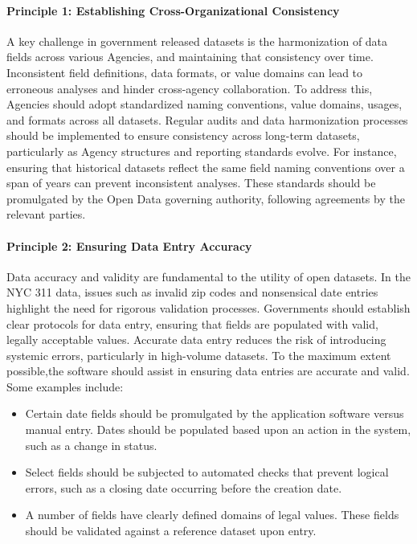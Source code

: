 \documentclass[linenumber]{jdsart}
\begin{document}
\paragraph{Principle 1: Establishing Cross-Organizational Consistency}
A key challenge in government released datasets is the 
harmonization of data fields across various Agencies, and 
maintaining that consistency over time. Inconsistent field
definitions, data formats, or value domains can lead to erroneous
analyses and hinder cross-agency collaboration.
To address this, Agencies should adopt 
standardized naming conventions, value domains, usages, and 
formats across all datasets. Regular audits and data harmonization 
processes should be implemented to ensure consistency 
across long-term datasets, particularly as Agency structures 
and reporting standards evolve. For instance, ensuring that 
historical datasets reflect the same field naming conventions 
over a span of years can prevent inconsistent analyses. 
These standards should be promulgated by the Open Data 
governing authority, following agreements by the relevant parties.

\paragraph{Principle 2: Ensuring Data Entry Accuracy}
Data accuracy and validity are fundamental to the utility of 
open datasets. In the NYC 311 data, issues such as 
invalid zip codes and nonsensical date entries 
highlight the need for rigorous validation processes. Governments 
should establish clear protocols for data entry, ensuring that 
fields are populated with valid, legally acceptable values. Accurate
data entry reduces the risk of introducing systemic errors,
particularly in high-volume datasets. To
the maximum extent possible,the software should assist in 
ensuring data entries are accurate and valid. Some examples include:

\begin{itemize}[left=1.5em]
    \item Certain date fields should be promulgated by the application software
     versus manual entry. Dates should be populated
    based upon an action in the system, such as a change in status. 
       
    \item Select fields should be subjected to automated checks 
    that prevent logical errors, such as a closing date occurring before the creation date. 
    
    \item A number of fields have clearly defined domains of legal
    values. These fields should be validated against a reference 
    dataset upon entry. 
 \end{itemize}
\end{document}
